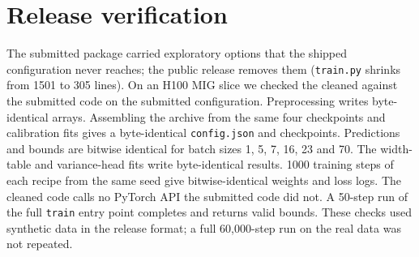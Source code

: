 \documentclass[10pt]{article}
\begin{document}
\section{Release verification}
\label{app:release}

The submitted package carried exploratory options that the shipped configuration never reaches; the public release removes them (\texttt{train.py} shrinks from 1501 to 305 lines). On an H100 MIG slice we checked the cleaned against the submitted code on the submitted configuration. Preprocessing writes byte-identical arrays. Assembling the archive from the same four checkpoints and calibration fits gives a byte-identical \texttt{config.json} and checkpoints. Predictions and bounds are bitwise identical for batch sizes 1, 5, 7, 16, 23 and 70. The width-table and variance-head fits write byte-identical results. 1000 training steps of each recipe from the same seed give bitwise-identical weights and loss logs. The cleaned code calls no PyTorch API the submitted code did not. A 50-step run of the full \texttt{train} entry point completes and returns valid bounds. These checks used synthetic data in the release format; a full 60,000-step run on the real data was not repeated.
\end{document}
